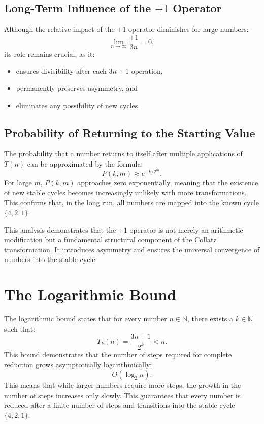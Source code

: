 \documentclass[a4paper,12pt]{article}
\begin{document}
\subsection{Long-Term Influence of the \(+1\) Operator}
Although the relative impact of the \(+1\) operator diminishes for large numbers:
\[
\lim_{n \to \infty} \frac{+1}{3n} = 0,
\]
its role remains crucial, as it:

\begin{itemize}
    \item ensures divisibility after each \( 3n+1 \) operation,
    \item permanently preserves asymmetry, and
    \item eliminates any possibility of new cycles.
\end{itemize}

\subsection{Probability of Returning to the Starting Value}
The probability that a number returns to itself after multiple applications of \( T(n) \) can be approximated by the formula:
\[
P(k, m) \approx e^{-k/2^m}.
\]
For large \( m \), \( P(k, m) \) approaches zero exponentially, meaning that the existence of new stable cycles becomes increasingly unlikely with more transformations. This confirms that, in the long run, all numbers are mapped into the known cycle \( \{4,2,1\} \).

This analysis demonstrates that the \(+1\) operator is not merely an arithmetic modification but a fundamental structural component of the Collatz transformation. It introduces asymmetry and ensures the universal convergence of numbers into the stable cycle.

\section{The Logarithmic Bound}
The logarithmic bound states that for every number \( n \in \mathbb{N} \), there exists a \( k \in \mathbb{N} \) such that:
\[
T_k(n) = \frac{3n + 1}{2^k} < n.
\]
This bound demonstrates that the number of steps required for complete reduction grows asymptotically logarithmically:
\[
O(\log_2 n).
\]
This means that while larger numbers require more steps, the growth in the number of steps increases only slowly. This guarantees that every number is reduced after a finite number of steps and transitions into the stable cycle \( \{4,2,1\} \).
\end{document}
